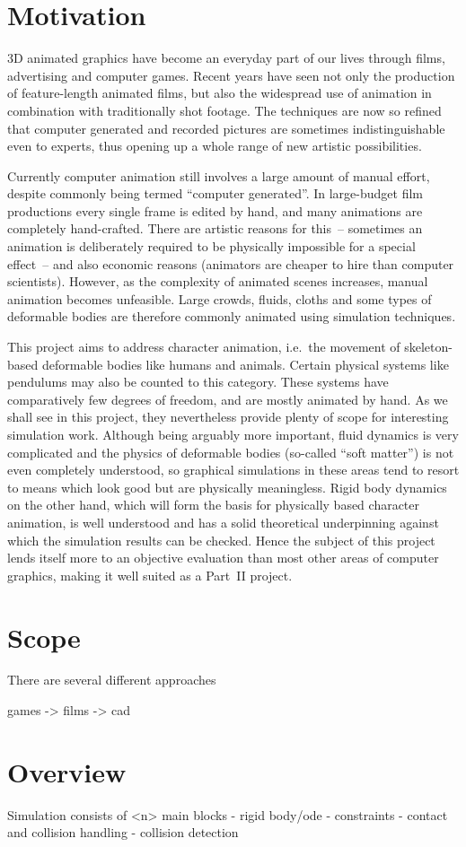 \section{Motivation}

3D animated graphics have become an everyday part of our lives through films, advertising and
computer games. Recent years have seen not only the production of feature-length animated films,
but also the widespread use of animation in combination with traditionally shot footage. The
techniques are now so refined that computer generated and recorded pictures are sometimes
indistinguishable even to experts, thus opening up a whole range of new artistic possibilities.

Currently computer animation still involves a large amount of manual effort, despite commonly
being termed ``computer generated''. In large-budget film productions every single frame is
edited by hand, and many animations are completely hand-crafted. There are artistic reasons for
this~-- sometimes an animation is deliberately required to be physically impossible for a special
effect~-- and also economic reasons (animators are cheaper to hire than computer scientists).
However, as the complexity of animated scenes increases, manual animation becomes unfeasible.
Large crowds, fluids, cloths and some types of deformable bodies are therefore commonly animated
using simulation techniques.

This project aims to address character animation, i.e.\ the movement of skeleton-based deformable
bodies like humans and animals. Certain physical systems like pendulums may also be counted to
this category. These systems have comparatively few degrees of freedom, and are mostly animated
by hand. As we shall see in this project, they nevertheless provide plenty of scope for
interesting simulation work. Although being arguably more important, fluid dynamics is very
complicated and the physics of deformable bodies (so-called ``soft matter'') is not even
completely understood, so graphical simulations in these areas tend to resort to means which look
good but are physically meaningless. Rigid body dynamics on the other hand, which will form the
basis for physically based character animation, is well understood and has a solid theoretical
underpinning against which the simulation results can be checked. Hence the subject of this
project lends itself more to an objective evaluation than most other areas of computer graphics,
making it well suited as a Part~II project.


\section{Scope}

There are several different approaches 

games -> films -> cad


\section{Overview}

Simulation consists of <n> main blocks
- rigid body/ode
- constraints
- contact and collision handling
- collision detection
